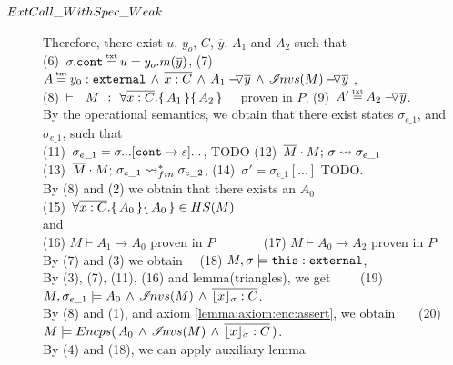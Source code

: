 \begin{description}
\item[${\sc{ExtCall\_WithSpec\_Weak}}$]

Therefore, there exist $u$, $y_o$, $C$, $\overline y$,  $A_1$ and $A_2$ such that \\
(6)\ $\sigma.\prg{cont}\txteq u=y_o.m(\overline y)$,  \hspace{2cm}
 (7)\ $A \txteq   { \external{y_0} }\, \wedge \, \overline {x:C}  \, \wedge \,  \PushAS  {y}{  A_1} \,   \wedge \,  \PushAS {y}{\extract{M}}\ $, 
\\
 (8)\ ${\vdash \ \ M\ \ \mathbf{:}\ \ \forall {\overline {x:C}}.\{\, A_1 \,\}\{\, A_2 \,\}}$ \ \ proven in $P$,   \hspace{1cm}
 (9)\ $A' \txteq \PushAS  {y} { A_2}$. 
 \\
 By the operational semantics, we obtain that there exist states $\sigma_{e\_1}$, and $\sigma_{e\_1}$, such that \\
 (11)\ $\sigma_{e\_1}=\sigma ...[\mbox{\normalfont{\texttt{cont}}}\mapsto s]... $, TODO   \hspace{1cm}
   (12)\ $\overline{M}\cdot M;\, {\sigma} \rightsquigarrow \sigma_{e\_1}$ \\
 (13)\ $\overline{M}\cdot M;\, {\sigma_{e\_1}} \rightsquigarrow^*_{fin} \sigma_{e\_2}$,   \hspace{1cm}
 (14)\ $\sigma'=\sigma_{e\_1}[...]$ TODO.
\\
By (8) and (2) we obtain that there exists an $A_0$ \\
(15)\ $\forall {\overline {x:C}}.\{\, A_0 \,\}\{\, A_0 \,\} \in HS(M)$\\ and \\
 (16) $M \vdash A_1 \rightarrow A_0$ proven in $P$ \ \ \ \ \ \ \  (17) $M \vdash A_0 \rightarrow A_2$ proven in $P$ 
 \\
By (7) and (3) we obtain \ \ 
(18) $M, \sigma \models \mbox{\normalfont{\texttt{this}}}:\mbox{\normalfont{\texttt{external}}}$, %
\\
By (3), (7), (11), (16) and lemma(triangles), we get \ \ \ \  (19) $M, \sigma_{e\_1} \models  {  A_0} \,   \wedge \,  {{\mathcal I}\!nvs(M)} \, \wedge \, 
\overline{ {\lfloor x \rfloor_{\sigma}} : C}$.
\\
By (8) and (1), and axiom \ref{lemma:axiom:enc:assert}, we obtain \ \ \ (20) \ $M \models {\ensuremath Encps(\, {  A_0} \,   \wedge \,  {\ensuremath{{\mathcal I}\!nvs(M)}} \, \wedge \, 
\overline{ {\lfloor x \rfloor_{\sigma}} : C}\, )}$.
\\
By (4) and (18), we can apply auxiliary lemma 

\end{description}
